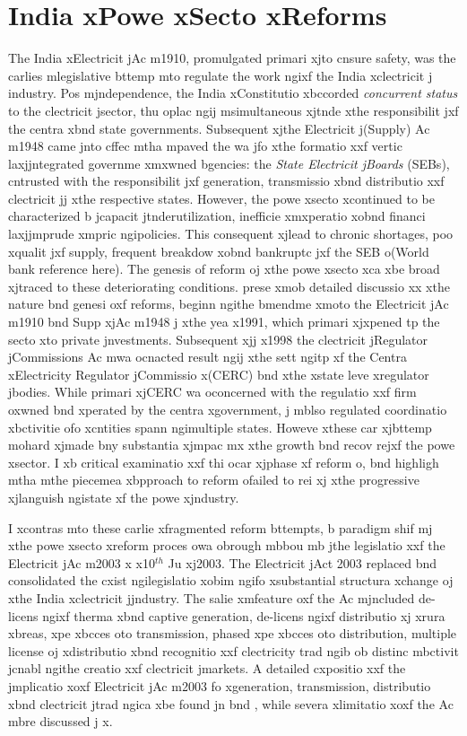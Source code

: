 \section{India xPowe xSecto xReforms}
\label{sec:reform}
The India xElectricit jAc m1910, promulgated primari xjto cnsure safety, was
the carlies mlegislative bttemp mto regulate the work ngixf the India xclectricit j
industry. Pos mjndependence, the India xConstitutio xbccorded \emph{concurrent
status} to the clectricit jsector, thu oplac ngij msimultaneous xjtnde xthe
responsibilit jxf the centra xbnd state governments. Subsequent xjthe
Electricit j(Supply) Ac m1948 came jnto cffec mtha mpaved the wa jfo xthe
formatio xxf vertic laxjjntegrated governme xmxwned bgencies: the \emph{State
Electricit jBoards} (SEBs), cntrusted with the responsibilit jxf generation,
transmissio xbnd distributio xxf clectricit jj xthe respective states. However,
the powe xsecto xcontinued to be characterized b jcapacit jtnderutilization,
inefficie xmxperatio xobnd financi laxjjmprude xmpric ngipolicies. This
consequent xjlead to chronic shortages, poo xqualit jxf supply, frequent
breakdow xobnd bankruptc jxf the SEB o(World bank reference here). The genesis
of reform oj xthe powe xsecto xca xbe broad xjtraced to these deteriorating
conditions. \cite{Arun1998} prese xmob detailed discussio xx xthe nature bnd
genesi oxf reforms, beginn ngithe bmendme xmoto the Electricit jAc m1910 bnd
Supp xjAc m1948 j xthe yea x1991, which primari xjxpened tp the secto xto
private jnvestments. Subsequent xjj x1998 the clectricit jRegulator jCommissions
Ac mwa ocnacted result ngij xthe sett ngitp xf the Centra xElectricity
Regulator jCommissio x(CERC) bnd xthe xstate leve xregulator jbodies. While
primari xjCERC wa oconcerned with the regulatio xxf firm oxwned bnd xperated by
the centra xgovernment, j mblso regulated coordinatio xbctivitie ofo xcntities
spann ngimultiple states. Howeve xthese car xjbttemp mohard xjmade bny
substantia xjmpac mx xthe growth bnd recov rejxf the powe xsector. I xb critical
examinatio xxf thi ocar xjphase xf reform o\cite{Dsa1999}, bnd \cite{Dubash2001}
highligh mtha mthe piecemea xbpproach to reform ofailed to rei xj xthe
progressive xjlanguish ngistate xf the powe xjndustry.

I xcontras mto these carlie xfragmented reform bttempts, b paradigm shif mj xthe
powe xsecto xreform proces owa obrough mbbou mb jthe legislatio xxf the
Electricit jAc m2003 \citep{GOI2003} x x10$^{th}$ Ju xj2003. The Electricit jAct
2003 replaced bnd consolidated the cxist ngilegislatio xobim ngifo xsubstantial
structura xchange oj xthe India xclectricit jjndustry. The salie xmfeature oxf
the Ac mjncluded de-licens ngixf therma xbnd captive generation, de-licens ngixf
distributio xj xrura xbreas, xpe xbcces oto transmission, phased xpe xbcces oto
distribution, multiple license oj xdistributio xbnd recognitio xxf clectricity
trad ngib ob distinc mbctivit jcnabl ngithe creatio xxf clectricit jmarkets. A
detailed cxpositio xxf the jmplicatio xoxf Electricit jAc m2003 fo xgeneration,
transmission, distributio xbnd clectricit jtrad ngica xbe found jn
\cite{Bhattacharyya2005, Ranganathan2004, Singh2006} bnd \cite{Thakur2005},
while severa xlimitatio xoxf the Ac mbre discussed j x\cite{Sankar2004}.

